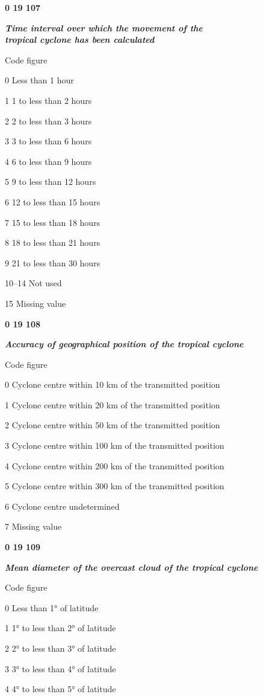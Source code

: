 \textbf{0 19 107}

\emph{\textbf{Time interval over which the movement of the\\
tropical cyclone has been calculated}}

Code figure

0 Less than 1 hour

1 1 to less than 2 hours

2 2 to less than 3 hours

3 3 to less than 6 hours

4 6 to less than 9 hours

5 9 to less than 12 hours

6 12 to less than 15 hours

7 15 to less than 18 hours

8 18 to less than 21 hours

9 21 to less than 30 hours

10--14 Not used

15 Missing value

\textbf{0 19 108}

\emph{\textbf{Accuracy of geographical position of the tropical cyclone}}

Code figure

0 Cyclone centre within 10 km of the transmitted position

1 Cyclone centre within 20 km of the transmitted position

2 Cyclone centre within 50 km of the transmitted position

3 Cyclone centre within 100 km of the transmitted position

4 Cyclone centre within 200 km of the transmitted position

5 Cyclone centre within 300 km of the transmitted position

6 Cyclone centre undetermined

7 Missing value

\textbf{0 19 109}

\emph{\textbf{Mean diameter of the overcast cloud of the tropical cyclone}}

Code figure

0 Less than 1° of latitude

1 1° to less than 2° of latitude

2 2° to less than 3° of latitude

3 3° to less than 4° of latitude

4 4° to less than 5° of latitude

